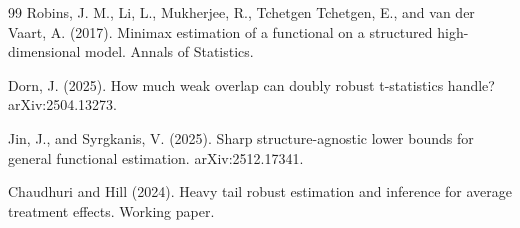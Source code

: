 \documentclass{article}
\begin{document}
\begin{thebibliography}{99}
   Robins, J. M., Li, L., Mukherjee, R., Tchetgen Tchetgen, E., and van der Vaart, A. (2017). Minimax estimation of a functional on a structured high-dimensional model. Annals of Statistics.

   Dorn, J. (2025). How much weak overlap can doubly robust t-statistics handle? arXiv:2504.13273.

   Jin, J., and Syrgkanis, V. (2025). Sharp structure-agnostic lower bounds for general functional estimation. arXiv:2512.17341.

   Chaudhuri and Hill (2024). Heavy tail robust estimation and inference for average treatment effects. Working paper.

\end{thebibliography}
\end{document}
